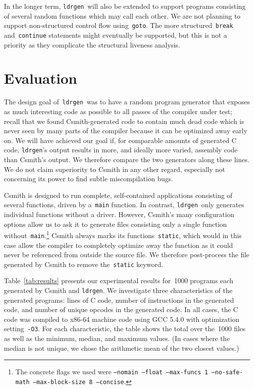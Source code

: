 \documentclass{llncs}
\newcommand\ldrgen{\texttt{ldrgen}}
\begin{document}
In the longer term, \ldrgen\ will also be extended to support programs
consisting of several random functions which may call each other. We are not
planning to support non-structured control flow using~\verb|goto|. The more
structured~\verb|break| and~\verb|continue| statements might eventually be
supported, but this is not a priority as they complicate the structural
liveness analysis.


\section{Evaluation}
\label{sec:evaluation}

The design goal of~\ldrgen\ was to have a random program generator that
exposes as much interesting code as possible to all passes of the compiler
under test; recall that we found Csmith-generated code to contain much dead
code which is never seen by many parts of the compiler because it can be
optimized away early on. We will have achieved our goal if, for comparable
amounts of generated C code, \ldrgen's output results in more, and ideally
more varied, assembly code than Csmith's output. We therefore compare the
two generators along these lines. We do not claim superiority to Csmith in
any other regard, especially not concerning its power to find subtle
miscompilation bugs.

Csmith is designed to run complete, self-contained applications consisting
of several functions, driven by a~\verb|main| function. In contrast,
\ldrgen\ only generates individual functions without a driver. However,
Csmith's many configuration options allow us to ask it to generate files
consisting only a single function without~\verb|main|.\footnote{The concrete
flags we used were \texttt{--nomain --float --max-funcs 1 --no-safe-math
--max-block-size 8 --concise}.} Csmith always marks its
functions~\verb|static|, which would in this case allow the compiler to
completely optimize away the function as it could never be referenced from
outside the source file. We therefore post-process the file generated by
Csmith to remove the~\verb|static| keyword.

Table~\ref{tab:results} presents our experimental results for~1000 programs
each generated by Csmith and \ldrgen. We investigate three characteristics
of the generated programs: lines of C code, number of instructions in the
generated code, and number of unique opcodes in the generated code. In all
cases, the C code was compiled to x86-64 machine code using GCC 5.4.0 with
optimization setting~\verb|-O3|. For each characteristic, the table shows
the total over the~1000 files as well as the minimum, median, and maximum
values. (In cases where the median is not unique, we chose the arithmetic
mean of the two closest values.)
\end{document}
